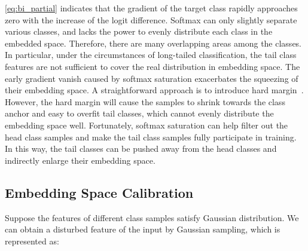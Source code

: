 \documentclass[10pt,twocolumn,letterpaper]{article}
\begin{document}
\cref{eq:bi_partial} indicates that the gradient of the target class rapidly approaches zero with the increase of the logit difference. Softmax can only slightly separate various classes, and lacks the power to evenly distribute each class in the embedded space. Therefore, there are many overlapping areas among the classes. In particular, under the circumstances of long-tailed classification, the tail class features are not sufficient to cover the real distribution in embedding space. The early gradient vanish caused by softmax saturation exacerbates the squeezing of their embedding space. A straightforward approach is to introduce hard margin~\cite{Deng2019ArcFace, Kaidi2019, Zhang2021class}. However, the hard margin will cause the samples to shrink towards the class anchor and easy to overfit tail classes, which cannot evenly distribute the embedding space well. Fortunately, softmax saturation can help filter out the head class samples and make the tail class samples fully participate in training. In this way, the tail classes can be pushed away from the head classes and indirectly enlarge their embedding space. 

\iffalse
\begin{figure}[t]
\centering
 \texttt{[image: ./Figure/gradient.png]}
 \caption{The gradient on   in binary classification case. As the logit difference increases, the gradient rapidly approaches zero.}
 \label{fig:ce}
 \vspace{-6pt}
\end{figure}
\fi

\subsection{Embedding Space Calibration}\label{sec:sc}
Suppose the features of different class samples satisfy Gaussian distribution. We can obtain a disturbed feature  of the input by Gaussian sampling, which is represented as:
\end{document}
